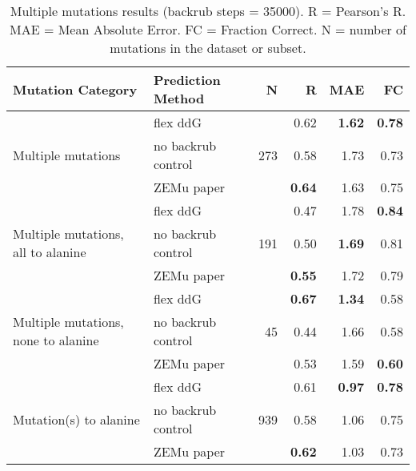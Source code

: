 \begin{table}
  \begin{tabular}{llrrrr}
\toprule
Mutation Category &   Prediction Method &    N &    R &  MAE &   FC \\
\midrule
 \multirow{ 3}{*}{Multiple mutations} & flex ddG & \multirow{ 3}{*}{273} & 0.62 & \textbf{1.62} & \textbf{0.78}  \\
 & no backrub control & & 0.58 & 1.73 & 0.73  \\
 & ZEMu paper & & \textbf{0.64} & 1.63 & 0.75  \\
\hline
 \multirow{ 3}{*}{Multiple mutations, all to alanine} & flex ddG & \multirow{ 3}{*}{191} & 0.47 & 1.78 & \textbf{0.84}  \\
 & no backrub control & & 0.50 & \textbf{1.69} & 0.81  \\
 & ZEMu paper & & \textbf{0.55} & 1.72 & 0.79  \\
\hline
 \multirow{ 3}{*}{Multiple mutations, none to alanine} & flex ddG & \multirow{ 3}{*}{45} & \textbf{0.67} & \textbf{1.34} & 0.58  \\
 & no backrub control & & 0.44 & 1.66 & 0.58  \\
 & ZEMu paper & & 0.53 & 1.59 & \textbf{0.60}  \\
\hline
 \multirow{ 3}{*}{Mutation(s) to alanine} & flex ddG & \multirow{ 3}{*}{939} & 0.61 & \textbf{0.97} & \textbf{0.78}  \\
 & no backrub control & & 0.58 & 1.06 & 0.75  \\
 & ZEMu paper & & \textbf{0.62} & 1.03 & 0.73  \\
\bottomrule
\end{tabular}
  \caption[Multiple mutations results]{
    Multiple mutations results (backrub steps = 35000). R = Pearson's R. MAE = Mean Absolute Error. FC = Fraction Correct. N = number of mutations in the dataset or subset.
  } \label{tab:table-mult}
\end{table}
